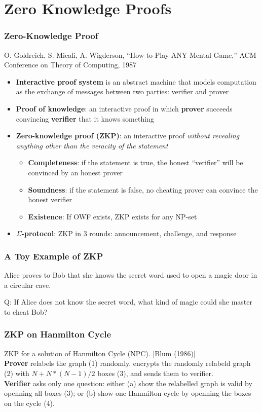 \section{Zero Knowledge Proofs}
\begin{frame}\frametitle{Zero-Knowledge Proof}
O. Goldreich, S. Micali, A. Wigderson, ``How to Play ANY Mental Game,'' ACM Conference on Theory of Computing, 1987
\begin{itemize}
\item \textbf{Interactive proof system} is an abstract machine that models computation as the exchange of messages between two parties: verifier and prover
\item \textbf{Proof of knowledge}: an interactive proof in which \textbf{prover} succeeds convincing \textbf{verifier} that it knows something
\item \textbf{Zero-knowledge proof (ZKP)}: an interactive proof \emph{without revealing anything other than the veracity of the statement}
\begin{itemize}
\item \textbf{Completeness}: if the statement is true, the honest ``verifier'' will be convinced by an honest prover
\item \textbf{Soundness}: if the statement is false, no cheating prover can convince the honest verifier
\item \textbf{Existence}: If OWF exists, ZKP exists for any NP-set
\end{itemize}
\item \textbf{$\Sigma$-protocol}: ZKP in 3 rounds: announcement, challenge, and response
\end{itemize}
\end{frame}
\begin{frame}\frametitle{A Toy Example of ZKP}
Alice {\color{red} \LARGE \Ladiesroom} proves to Bob {\color{blue} \LARGE \Gentsroom} that she knows the secret word used to open a magic door in a circular cave.
\begin{figure}
\begin{center}

\end{center}
\end{figure}
\alert{Q: If Alice does not know the secret word, what kind of magic could she master to cheat Bob?}
\end{frame}
\begin{frame}\frametitle{ZKP on Hanmilton Cycle}
ZKP for a solution of Hanmilton Cycle (NPC). [Blum (1986)] \\
\textbf{Prover} relabels the graph (1) randomly, encrypts the randomly relabeld graph (2) with $N + N*(N-1)/2$ boxes (3), and sends them to verifier. \\
\textbf{Verifier} asks only one question: either (a) show the relabelled graph is valid by openning all boxes (3); or (b) show one Hanmilton cycle by openning the boxes on the cycle (4).
\begin{figure}
\begin{center}

\end{center}
\end{figure}
\end{frame}
